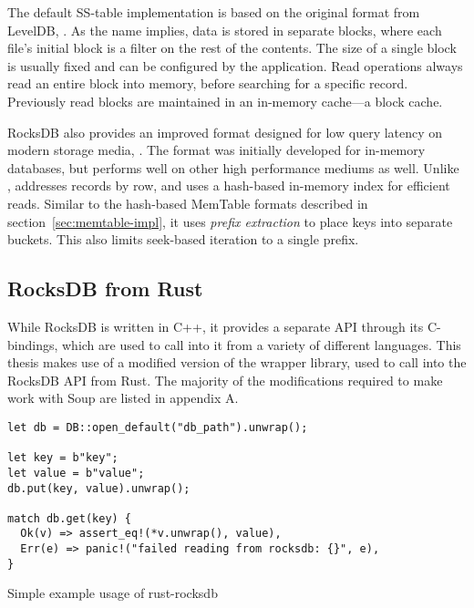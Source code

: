 The default SS-table implementation is based on the original format from
LevelDB,
.
As the name implies, data is stored in separate blocks, where each file's
initial block is a filter on the rest of the contents. The size of a single
block is usually fixed and can be configured by the application. Read operations
always read an entire block into memory, before searching for a specific record.
Previously read blocks are maintained in an in-memory cache---a block cache.

RocksDB also provides an improved format designed for low query latency on
modern storage media,
.
The format was initially developed for in-memory databases, but performs well on
other high performance mediums as well. Unlike ,
 addresses records by row, and uses a hash-based in-memory
index for efficient reads. Similar to the hash-based MemTable formats described
in section~\ref{sec:memtable-impl}, it uses \textit{prefix extraction} to place
keys into separate buckets. This also limits seek-based iteration to a single
prefix.

\subsection{RocksDB from Rust}\label{sec:rust-rocksdb}

While RocksDB is written in C++, it provides a separate API through its
C-bindings, which are used to call into it from a variety of different
languages.
This thesis makes use of a modified version of the
 wrapper
library, used to call into the RocksDB API from Rust. The majority of the
modifications required to make  work with Soup are listed in
appendix A.

\begin{listing}[H]
  \begin{verbatim}
let db = DB::open_default("db_path").unwrap();

let key = b"key";
let value = b"value";
db.put(key, value).unwrap();

match db.get(key) {
  Ok(v) => assert_eq!(*v.unwrap(), value),
  Err(e) => panic!("failed reading from rocksdb: {}", e),
}
  \end{verbatim}

  \caption{Simple example usage of rust-rocksdb}\label{lst:rocksdb-rust}
\end{listing}

